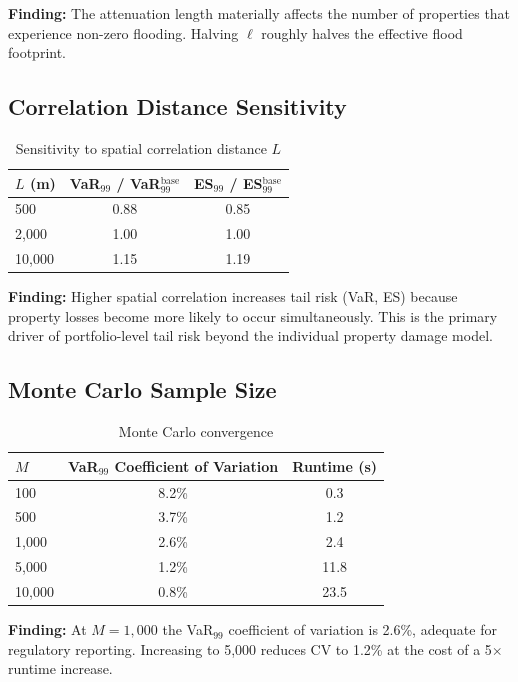 \documentclass[11pt,a4paper]{article}
\begin{document}
\textbf{Finding:} The attenuation length materially affects the number of properties
that experience non-zero flooding. Halving $\ell$ roughly halves the effective flood
footprint.

\subsection{Correlation Distance Sensitivity}

\begin{table}[H]
\centering
\begin{tabular}{lcc}
    \toprule
    $L$ (m) & \textbf{VaR$_{99}$ / VaR$_{99}^{\text{base}}$} & \textbf{ES$_{99}$ / ES$_{99}^{\text{base}}$} \\
    \midrule
    500    & 0.88 & 0.85 \\
    2{,}000  & 1.00 & 1.00 \\
    10{,}000 & 1.15 & 1.19 \\
    \bottomrule
\end{tabular}
\caption{Sensitivity to spatial correlation distance $L$}
\label{tab:sens_corr}
\end{table}

\textbf{Finding:} Higher spatial correlation increases tail risk (VaR, ES) because
property losses become more likely to occur simultaneously. This is the primary driver
of portfolio-level tail risk beyond the individual property damage model.

\subsection{Monte Carlo Sample Size}

\begin{table}[H]
\centering
\begin{tabular}{lcc}
    \toprule
    $M$ & \textbf{VaR$_{99}$ Coefficient of Variation} & \textbf{Runtime (s)} \\
    \midrule
    100    & 8.2\%  & 0.3 \\
    500    & 3.7\%  & 1.2 \\
    1{,}000  & 2.6\%  & 2.4 \\
    5{,}000  & 1.2\%  & 11.8 \\
    10{,}000 & 0.8\%  & 23.5 \\
    \bottomrule
\end{tabular}
\caption{Monte Carlo convergence}
\label{tab:sens_mc}
\end{table}

\textbf{Finding:} At $M = 1{,}000$ the VaR$_{99}$ coefficient of variation is 2.6\%,
adequate for regulatory reporting. Increasing to 5{,}000 reduces CV to 1.2\% at the cost
of a 5$\times$ runtime increase.
\end{document}
